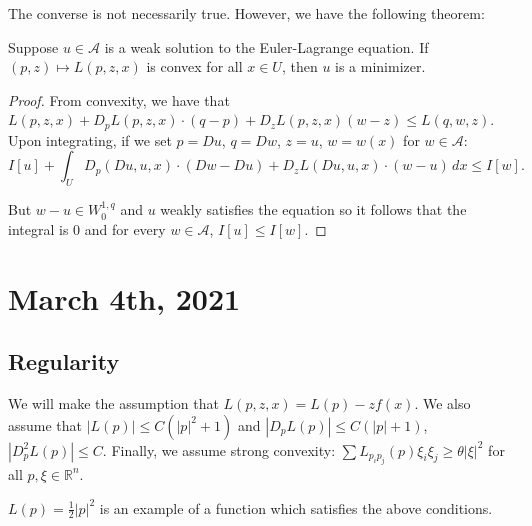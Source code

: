 \documentclass[12pt]{scrartcl}
\newcommand{\R}{\mathbb{R}}
\newcommand{\<}{\langle}
\renewcommand{\>}{\rangle}
\let \mc \mathcal
\begin{document}
\begin{remark} The converse is not necessarily true.  However, we have the following theorem:
\end{remark}

\begin{thm} Suppose $u \in \mc A$ is a weak solution to the Euler-Lagrange equation.  If $(p, z) \mapsto L(p, z, x)$ is convex for all $x \in U$, then $u$ is a minimizer.  
\end{thm}
\begin{proof}
From convexity, we have that $L(p, z, x) + D_pL(p, z, x) \cdot (q - p) + D_zL(p, z, x)(w-z) \le L(q, w, z)$.  Upon integrating, if we set $p = Du$, $q = Dw$, $z = u$, $w = w(x)$ for $w \in \mc A$:
$$I[u] + \int_U D_p(Du, u, x)\cdot (Dw - Du) + D_zL(Du, u, x)\cdot (w - u)\, dx \le I[w].$$

But $w - u \in W_0^{1, q}$ and $u$ weakly satisfies the equation so it follows that the integral is $0$ and for every $w \in \mc A$, $I[u] \le I[w]$.
\end{proof}



\pagebreak
\section{March 4th, 2021}
\subsection{Regularity}
We will make the assumption that $L(p, z, x) = L(p) - zf(x)$.  We also assume that $|L(p)| \le C(|p|^2 + 1)$ and $|D_pL(p)| \le C(|p| + 1)$, $|D_p^2 L(p)| \le C$.  Finally, we assume strong convexity: $\sum L_{p_i p_j} (p) \xi_i \xi_j \ge \theta |\xi|^2$ for all $p, \xi \in \R^n$.  

\begin{example} $L(p) = \frac{1}{2}|p|^2$ is an example of a function which satisfies the above conditions. 
\end{example}
\end{document}
